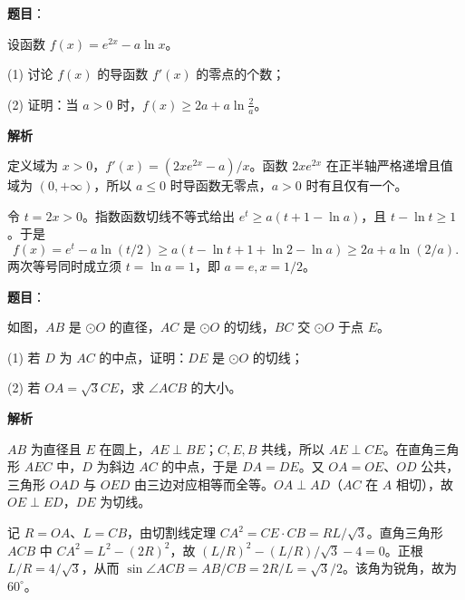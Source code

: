 \begin{answer}

\textbf{题目}：

设函数 $f(x)=e^{2x}-a\ln x$。

(1) 讨论 $f(x)$ 的导函数 $f'(x)$ 的零点的个数；

(2) 证明：当 $a>0$ 时，$f(x)\geqslant2a+a\ln\frac2a$。

\textbf{解析}


定义域为 $x>0$，$f'(x)=(2xe^{2x}-a)/x$。函数 $2xe^{2x}$ 在正半轴严格递增且值域为 $(0,+\infty)$，所以 $a\le0$ 时导函数无零点，$a>0$ 时有且仅有一个。


令 $t=2x>0$。指数函数切线不等式给出 $e^t\ge a(t+1-\ln a)$，且 $t-\ln t\ge1$。于是
\nopagebreak[4]
\[f(x)=e^t-a\ln(t/2)\ge a(t-\ln t+1+\ln2-\ln a)\ge2a+a\ln(2/a).\]
两次等号同时成立须 $t=\ln a=1$，即 $a=e,x=1/2$。



\end{answer}
\begin{answer}

\textbf{题目}：

如图，$AB$ 是 $\odot O$ 的直径，$AC$ 是 $\odot O$ 的切线，$BC$ 交 $\odot O$ 于点 $E$。

(1) 若 $D$ 为 $AC$ 的中点，证明：$DE$ 是 $\odot O$ 的切线；

(2) 若 $OA=\sqrt3 CE$，求 $\angle ACB$ 的大小。
\nopagebreak[4]
\begin{center}\end{center}
\nopagebreak[4]
\textbf{解析}


$AB$ 为直径且 $E$ 在圆上，$AE\perp BE$；$C,E,B$ 共线，所以 $AE\perp CE$。在直角三角形 $AEC$ 中，$D$ 为斜边 $AC$ 的中点，于是 $DA=DE$。又 $OA=OE$、$OD$ 公共，三角形 $OAD$ 与 $OED$ 由三边对应相等而全等。$OA\perp AD$（$AC$ 在 $A$ 相切），故 $OE\perp ED$，$DE$ 为切线。


记 $R=OA$、$L=CB$，由切割线定理 $CA^2=CE\cdot CB=RL/\sqrt3$。直角三角形 $ACB$ 中 $CA^2=L^2-(2R)^2$，故 $(L/R)^2-(L/R)/\sqrt3-4=0$。正根 $L/R=4/\sqrt3$，从而 $\sin\angle ACB=AB/CB=2R/L=\sqrt3/2$。该角为锐角，故为 $60^\circ$。



\end{answer}
